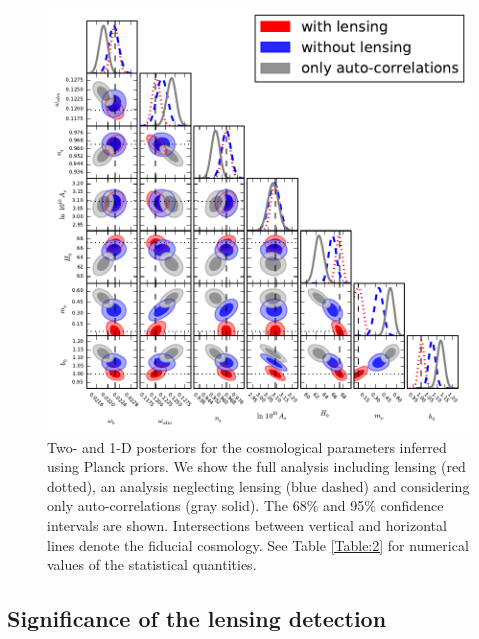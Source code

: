 \begin{figure}[bthp]
  \centering
  \includegraphics[width=\textwidth]{figures/chapter-mnu/triangle_figure_MCDM_bias_cmb_prior.pdf}
  \caption{Two- and 1-D posteriors for the cosmological parameters inferred using Planck priors. We show the full analysis including lensing (red dotted), an analysis neglecting lensing (blue dashed) and considering only auto-correlations (gray solid).
    The 68\% and 95\% confidence intervals are shown.
    Intersections between vertical and horizontal lines denote the fiducial cosmology.
   See Table \ref{Table:2} for numerical values of the statistical quantities.
  }
  \label{fig:mcmc-cmb-prior}
\end{figure}

\subsection{Significance of the lensing detection}

